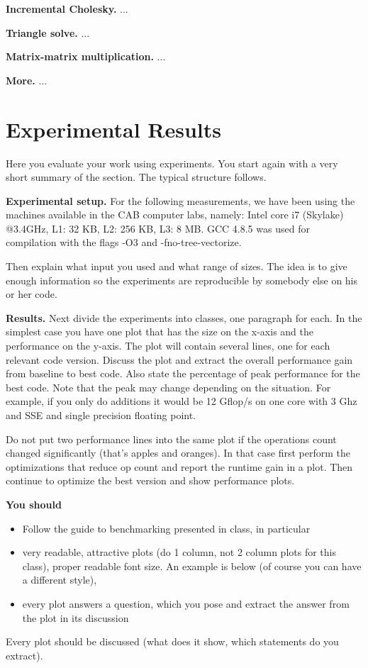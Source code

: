 \documentclass[letterpaper]{article}
\newcommand{\mypar}[1]{{\bf #1.}}
\begin{document}
\mypar{Incremental Cholesky} ...

\mypar{Triangle solve} ...

\mypar{Matrix-matrix multiplication} ...

\mypar{More} ...

\section{Experimental Results}\label{sec:exp}

Here you evaluate your work using experiments. You start again with a
very short summary of the section. The typical structure follows.

\mypar{Experimental setup} For the following measurements, we have been using the machines available in the CAB computer labs, namely: Intel core i7 (Skylake) @3.4GHz, L1: 32 KB, L2: 256 KB, L3: 8 MB. GCC 4.8.5 was used for compilation with the flags -O3 and -fno-tree-vectorize.

Then explain what input you used and what range of sizes. The idea is to give enough information so the experiments are reproducible by somebody else on his or her code.

\mypar{Results}
Next divide the experiments into classes, one paragraph for each. In the simplest case you have one plot that has the size on the x-axis and the performance on the y-axis. The plot will contain several lines, one for each relevant code version. Discuss the plot and extract the overall performance gain from baseline to best code. Also state the percentage of peak performance for the best code. Note that the peak may change depending on the situation. For example, if you only do additions it would be 12 Gflop/s
on one core with 3 Ghz and SSE and single precision floating point.

Do not put two performance lines into the same plot if the operations count changed significantly (that's apples and oranges). In that case first perform the optimizations that reduce op count and report the runtime gain in a plot. Then continue to optimize the best version and show performance plots.

{\bf You should}
\begin{itemize}
\item Follow the guide to benchmarking presented in class, in particular
\item very readable, attractive plots (do 1 column, not 2 column plots
for this class), proper readable font size. An example is below (of course you can have a different style),
\item every plot answers a question, which you pose and extract the
answer from the plot in its discussion
\end{itemize}
Every plot should be discussed (what does it show, which statements do
you extract).
\end{document}
